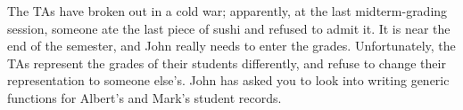 The TAs have broken out in a cold war; apparently, at the last
midterm-grading session, someone ate the last piece of sushi and
refused to admit it. It is near the end of the semester, and John
really needs to enter the grades.  Unfortunately, the TAs represent the
grades of their students differently, and refuse to change their
representation to someone else's. John has asked you to look into
writing generic functions for Albert's and Mark's student records.

